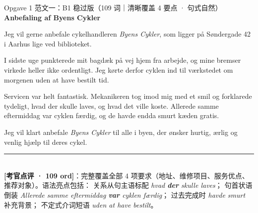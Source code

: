 \begin{emailbox}{Opgave 1 范文一：B1 稳过版（109 词｜清晰覆盖 4 要点 · 句式自然）}
\textbf{Anbefaling af Byens Cykler}

Jeg vil gerne anbefale cykelhandleren \textit{Byens Cykler}, som ligger på Søndergade 42 i Aarhus lige ved biblioteket.

I sidste uge punkterede mit bagdæk på vej hjem fra arbejde, og mine bremser virkede heller ikke ordentligt. Jeg kørte derfor cyklen ind til værkstedet om morgenen uden at have bestilt tid.

Servicen var helt fantastisk. Mekanikeren tog imod mig med et smil og forklarede tydeligt, hvad der skulle laves, og hvad det ville koste. Allerede samme eftermiddag var cyklen færdig, og de havde endda smurt kæden gratis.

Jeg vil klart anbefale \textit{Byens Cykler} til alle i byen, der ønsker hurtig, ærlig og venlig hjælp til deres cykel.

\vspace{0.3em}
\rule{\linewidth}{0.4pt}\\[0.2em]
\small\textbf{\color{NCDTeal}[考官点评 · 109 ord]}：完整覆盖全部 4 项要求（地址、维修项目、服务优点、推荐对象）。语法亮点包括： 关系从句主语标配 \textit{hvad \textbf{der} skulle laves}； 句首状语倒装 \textit{Allerede samme eftermiddag \textbf{var} cyklen færdig}； 过去完成时 \textit{havde smurt} 补充背景； 不定式介词短语 \textit{uden at have bestilt}。
\end{emailbox}


